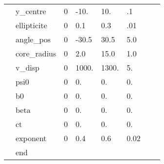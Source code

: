 {\begin{tabular}{llllllll}
        &y\_centre      & 0 &    -10.  &    10.  &    .1  & & \\
        &ellipticite   & 0 &      0.1 &     0.3 &    .01 & & \\
        &angle\_pos     & 0 &    -30.5 &    30.5 &   5.0 & & \\
        &core\_radius   & 0 &      2.0 &    15.0 &   1.0 & & \\
        &v\_disp        & 0 &   1000.  &  1300.  & 5. & & \\
        &psi0          & 0 &      0.  &     0.  &   0. & & \\
        &b0            & 0 &      0.  &     0.  &   0. & & \\
        &beta          & 0 &      0.  &     0.  &   0. & & \\
        &ct            & 0 &      0.  &     0.  &   0. & & \\
        &exponent      & 0 &      0.4 &     0.6 &   0.02 & & \\
        &end & & & & & & \\
\end{tabular}
}\\
\vfill
